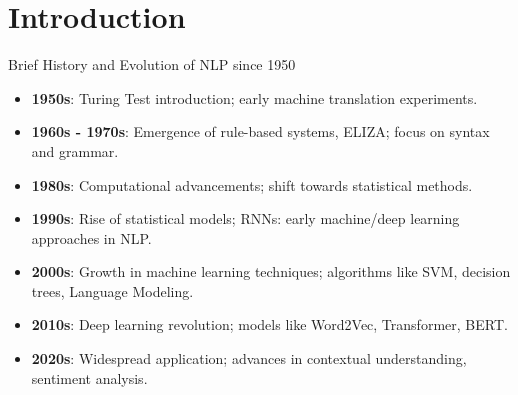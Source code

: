 \documentclass{beamer}
\begin{document}
\section{Introduction}

\begin{frame}{Brief History and Evolution of NLP since 1950}

\begin{itemize}
  \item \textbf{1950s}: Turing Test introduction; early machine translation experiments.
  \item \textbf{1960s - 1970s}: Emergence of rule-based systems, ELIZA; focus on syntax and grammar.
  \item \textbf{1980s}: Computational advancements; shift towards statistical methods.
  \item \textbf{1990s}: Rise of statistical models; RNNs: early machine/deep learning approaches in NLP.
  \item \textbf{2000s}: Growth in machine learning techniques; algorithms like SVM, decision trees, Language Modeling.
  \item \textbf{2010s}: Deep learning revolution; models like Word2Vec, Transformer, BERT.
  \item \textbf{2020s}: Widespread application; advances in contextual understanding, sentiment analysis.
\end{itemize}

\end{frame}
\end{document}
